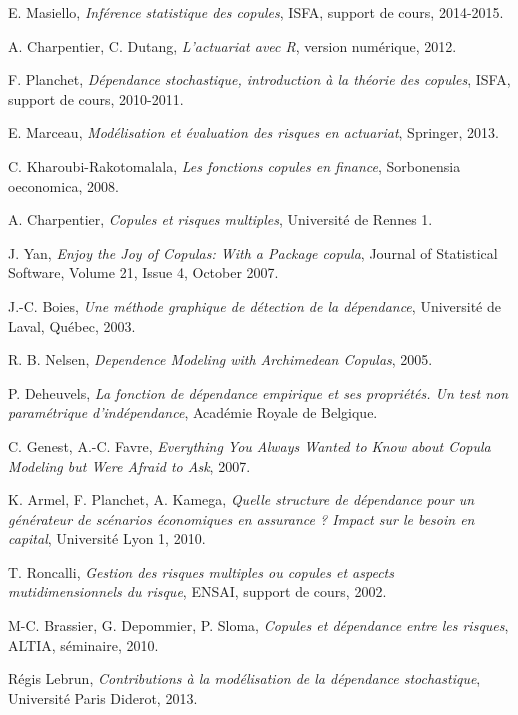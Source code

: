 \begin{thebibliography}{ABC}	

 E. Masiello, \emph{Inférence statistique des copules}, ISFA, support de cours, 2014-2015.

 A. Charpentier, C. Dutang, \emph{L'actuariat avec R}, version numérique, 2012.

\label{ref1} F. Planchet, \emph{Dépendance stochastique, introduction à la théorie des copules}, ISFA, support de cours, 2010-2011.

 E. Marceau, \emph{Modélisation et évaluation des risques en actuariat}, Springer, 2013.

 C. Kharoubi-Rakotomalala, \emph{Les fonctions copules en finance}, Sorbonensia oeconomica, 2008.

 A. Charpentier, \emph{Copules et risques multiples}, Université de Rennes 1.

 J. Yan, \emph{Enjoy the Joy of Copulas: With a Package copula}, Journal of Statistical Software, Volume 21, Issue 4, October 2007.

 J.-C. Boies, \emph{Une méthode graphique de détection de la dépendance}, Université de Laval,
Québec, 2003.

 R. B. Nelsen, \emph{Dependence Modeling with Archimedean Copulas}, 2005.

 P. Deheuvels, \emph{La fonction de dépendance empirique et ses propriétés. Un test non paramétrique d'indépendance}, Académie Royale de Belgique.

 C. Genest, A.-C. Favre, \emph{Everything You Always Wanted to Know about Copula Modeling but Were Afraid to Ask}, 2007.

 K. Armel, F. Planchet, A. Kamega, \emph{Quelle structure de dépendance pour un générateur de scénarios économiques en assurance ? Impact sur le besoin en capital}, Université Lyon 1, 2010.

\label{ref3} T. Roncalli, \emph{Gestion des risques multiples ou copules et aspects mutidimensionnels du risque}, ENSAI, support de cours, 2002.

\label{ref4} M-C. Brassier, G. Depommier, P. Sloma, \emph{Copules et dépendance entre les risques}, ALTIA, séminaire, 2010.

 Régis Lebrun, \emph{Contributions à la modélisation
de la dépendance stochastique}, Université Paris Diderot, 2013. 



\end{thebibliography}


